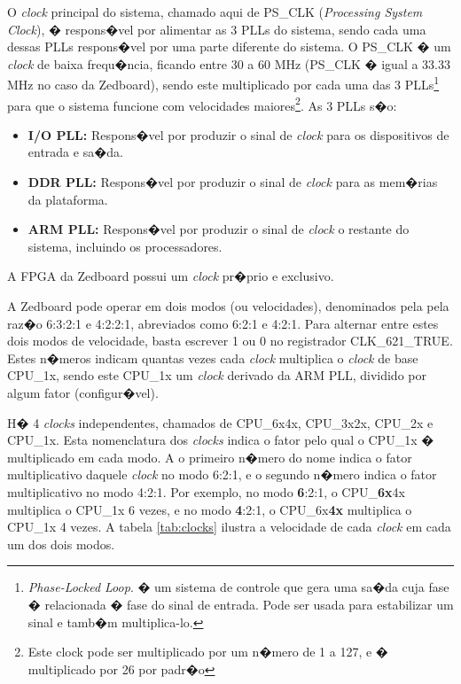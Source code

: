 \documentclass{ufscThesis/ufscThesis} %
\begin{document}
O \emph{clock} principal do sistema, chamado aqui de PS\_CLK (\emph{Processing System Clock}), � respons�vel por alimentar as 3 PLLs do sistema, sendo cada uma dessas PLLs respons�vel por uma parte diferente do sistema\cite[p.~622]{ug585}. O PS\_CLK � um \emph{clock} de baixa frequ�ncia, ficando entre 30 a 60 MHz (PS\_CLK � igual a 33.33 MHz no caso da Zedboard), sendo este multiplicado por cada uma das 3 PLLs\footnote{\emph{Phase-Locked Loop}. � um sistema de controle que gera uma sa�da cuja fase � relacionada � fase do sinal de entrada. Pode ser usada para estabilizar um sinal e tamb�m multiplica-lo.} para que o sistema funcione com velocidades maiores\footnote{Este clock pode ser multiplicado por um n�mero de 1 a 127, e � multiplicado por 26 por padr�o}. As 3 PLLs s�o:

\begin{itemize}
	\item \textbf{I/O PLL:} Respons�vel por produzir o sinal de \emph{clock} para os dispositivos de entrada e sa�da.
	\item \textbf{DDR PLL:} Respons�vel por produzir o sinal de \emph{clock} para as mem�rias da plataforma.
	\item \textbf{ARM PLL:} Respons�vel por produzir o sinal de \emph{clock} o restante do sistema, incluindo os processadores.
\end{itemize}

A FPGA da Zedboard possui um \emph{clock} pr�prio e exclusivo.

A Zedboard pode operar em dois modos (ou velocidades), denominados pela pela raz�o 6:3:2:1 e 4:2:2:1, abreviados como 6:2:1 e 4:2:1. Para alternar entre estes dois modos de velocidade, basta escrever 1 ou 0 no registrador CLK\_621\_TRUE. Estes n�meros indicam quantas vezes cada \emph{clock} multiplica o \emph{clock} de base CPU\_1x, sendo este CPU\_1x um \emph{clock} derivado da ARM PLL, dividido por algum fator (configur�vel).

H� 4 \emph{clocks} independentes, chamados de CPU\_6x4x, CPU\_3x2x, CPU\_2x e CPU\_1x. Esta nomenclatura dos \emph{clocks} indica o fator pelo qual o CPU\_1x � multiplicado em cada modo.
A o primeiro n�mero do nome indica o fator multiplicativo daquele \emph{clock} no modo 6:2:1, e o segundo n�mero indica o fator multiplicativo no modo 4:2:1.
Por exemplo, no modo \textbf{6}:2:1, o CPU\_\textbf{6x}4x multiplica o CPU\_1x 6 vezes, e no modo \textbf{4}:2:1, o CPU\_6x\textbf{4x} multiplica o CPU\_1x 4 vezes. A tabela \ref{tab:clocks} ilustra a velocidade de cada \emph{clock} em cada um dos dois modos.
\end{document}
